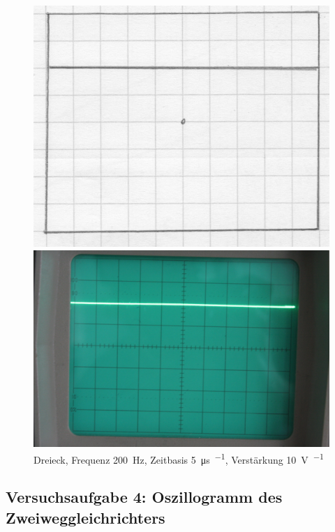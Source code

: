 \begin{figure}[htbp]
	\centering
	\begin{minipage}{.45\linewidth}
	\includegraphics[width=\linewidth]{Oszi_Hand/795.jpg}
	\end{minipage}
	\hfill
	\begin{minipage}{.45\linewidth}
	\includegraphics[width=\linewidth]{Oszi_Foto/795.jpg}
	\end{minipage}
	\caption{%
		Dreieck, Frequenz \SI{200}{\hertz},
		Zeitbasis \SI{5}{\micro\second\per\division},
		Verstärkung \SI{10}{\volt\per\division}
	}
	\label{fig:795}
\end{figure}

\FloatBarrier
\subsection{Versuchsaufgabe 4: Oszillogramm des Zweiweggleichrichters}

